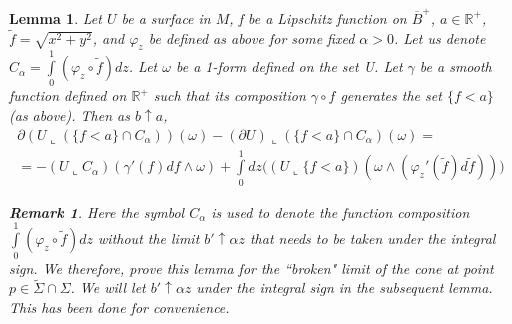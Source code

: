 \documentclass{amsart}
\newcommand{\ts}{\tilde{\Sigma}}
\newtheorem*{remark}{Remark}
\newtheorem{lemma}{Lemma}
\theoremstyle{named}
\begin{document}
\begin{lemma} \label{lemma: slice algebra}
    Let $U$ be a surface in $M$, f be a Lipschitz function on $\overline{B}^{+}$, $a \in \mathbb{R}^{+}$, $\tilde{f} = \sqrt{x^2 + y^2}$, and $\varphi_z$ be defined as above for some fixed $\alpha > 0$. Let us denote $C_{\alpha} = \int\limits_{0}^{1} (\varphi_z \circ \tilde{f}) dz$. Let $\omega$ be a 1-form defined on the set U. Let $\gamma$ be a smooth function defined on $\mathbb{R}^{+}$ such that its composition $\gamma \circ f$ generates the set $\{f < a\}$ (as above). Then as $b \uparrow a$,
    \begin{align*}
        \partial (U \llcorner (\{f < a\} \cap C_{\alpha})) (\omega) - (\partial U) \llcorner (\{f < a\} \cap C_{\alpha})(\omega) = \\ 
        = - (U \llcorner C_{\alpha})(\gamma'(f)df \wedge \omega) + \int\limits_{0}^{1} dz \Big( (U \llcorner \{ f < a \})(\omega \wedge (\varphi_{z}'(\tilde{f})d\tilde{f})) \Big)
    \end{align*}
    
\begin{remark} \nonumber
    Here the symbol $C_{\alpha}$ is used to denote the function composition $\int\limits_{0}^{1} (\varphi_z \circ \tilde{f}) dz$ without the limit $b' \uparrow \alpha z$ that needs to be taken under the integral sign. We therefore, prove this lemma for the ``broken" limit of the cone at point $p \in \ts \cap \Sigma$. We will let $b' \uparrow \alpha z$ under the integral sign in the subsequent lemma. This has been done for convenience.
\end{remark}
    
\end{lemma}
\end{document}
